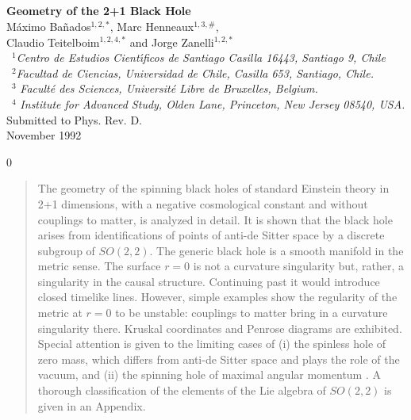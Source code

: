 \documentclass[12pt]{article}
\newcounter{c1} \newcounter{c2}
\begin{document}
{}~\\
{}~\\
{}~\\
{}~\\
\begin{center}
{\huge {\bf Geometry of the 2+1 Black Hole}}\\
\vspace{3cm}
{\large M\'aximo Ba\~nados$^{1,2,*}$, Marc Henneaux$^{1,3,\#}$}, \\
{\large Claudio Teitelboim$^{1,2,4,*}$ and Jorge Zanelli$^{1,2,*}$} \\
\vspace{1.5cm}
{}~$^1${\em Centro de Estudios Cient\'{\i}ficos de Santiago
Casilla 16443, Santiago 9, Chile} \\
{}~$^2${\em Facultad de Ciencias, Universidad de Chile, Casilla 653,
Santiago, Chile.} \\
{}~$^3$ {\em Facult\'e des Sciences, Universit\'e
Libre de Bruxelles, Belgium.} \\
{}~$^4$ {\em Institute for Advanced Study, Olden Lane,
Princeton, New Jersey 08540, USA. }\\
\vspace{5cm}
Submitted to Phys. Rev. D. \\
November 1992
\end{center}


\setcounter{page} 0
\newpage

\begin{abstract}

The geometry of the spinning black holes of standard Einstein
theory in 2+1 dimensions, with a negative cosmological constant
and without couplings to matter, is analyzed in detail. It is
shown that the black hole arises from identifications of points
of anti-de Sitter space by a discrete subgroup of $SO(2,2)$. The
generic black hole is a smooth manifold in the metric sense. The
surface $r=0$ is not a curvature singularity but, rather, a
singularity in the causal structure.  Continuing past it would
introduce closed timelike lines. However, simple examples show
the regularity of the metric at $r=0$ to be unstable: couplings
to matter bring in a curvature singularity there. Kruskal
coordinates and Penrose diagrams are exhibited. Special
attention is given to the limiting cases of (i) the spinless
hole of zero mass, which differs from anti-de Sitter space and
plays the role of the vacuum, and (ii) the spinning hole of
maximal angular momentum .  A thorough classification of the
elements of the Lie algebra of $SO(2,2)$ is given in an
Appendix.
\smallskip
\bigskip


\end{abstract}
\end{document}
